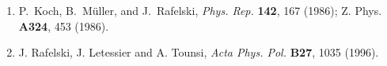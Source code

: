 \begin{mdframed}[linecolor=gray,roundcorner=12pt,backgroundcolor=Dandelion!15,linewidth=1pt,leftmargin=0cm,rightmargin=0cm,topline=true,bottomline=true,skipabove=12pt]
{\begin{enumerate}
\item%
P.~Koch, B.~M\"uller, and J.~Rafelski, {\it Phys. Rep.} {\bf 142},
167 (1986); Z. Phys. {\bf A324}, 453 (1986).

\item%
J. Rafelski, J. Letessier and A. Tounsi,
{\it Acta Phys. Pol.} {\bf B27}, 1035 (1996).

\end{enumerate}
}
\end{mdframed}



 
 
